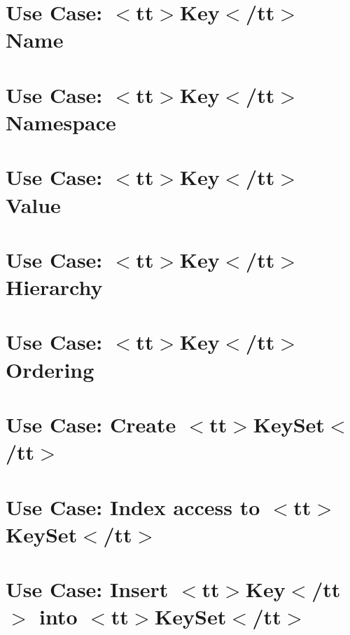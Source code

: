 \let\mypdfximage\pdfximage\def\pdfximage{\immediate\mypdfximage}\documentclass[twoside]{book}
\newcommand{\+}{\discretionary{\mbox{\scriptsize$\hookleftarrow$}}{}{}}
\begin{document}
\chapter{Use Case\+: $<$tt$>$Key$<$/tt$>$ Name}
\label{doc_usecases_core_UC_key_name_md}

\chapter{Use Case\+: $<$tt$>$Key$<$/tt$>$ Namespace}
\label{doc_usecases_core_UC_key_namespace_md}

\chapter{Use Case\+: $<$tt$>$Key$<$/tt$>$ Value}
\label{doc_usecases_core_UC_key_value_md}

\chapter{Use Case\+: $<$tt$>$Key$<$/tt$>$ Hierarchy}
\label{doc_usecases_core_UC_keyname_hierarchy_md}

\chapter{Use Case\+: $<$tt$>$Key$<$/tt$>$ Ordering}
\label{doc_usecases_core_UC_keyname_ordering_md}

\chapter{Use Case\+: Create $<$tt$>$Key\+Set$<$/tt$>$}
\label{doc_usecases_core_UC_keyset_create_md}

\chapter{Use Case\+: Index access to $<$tt$>$Key\+Set$<$/tt$>$}
\label{doc_usecases_core_UC_keyset_index_access_md}

\chapter{Use Case\+: Insert $<$tt$>$Key$<$/tt$>$ into $<$tt$>$Key\+Set$<$/tt$>$}
\label{doc_usecases_core_UC_keyset_insert_md}

\end{document}
